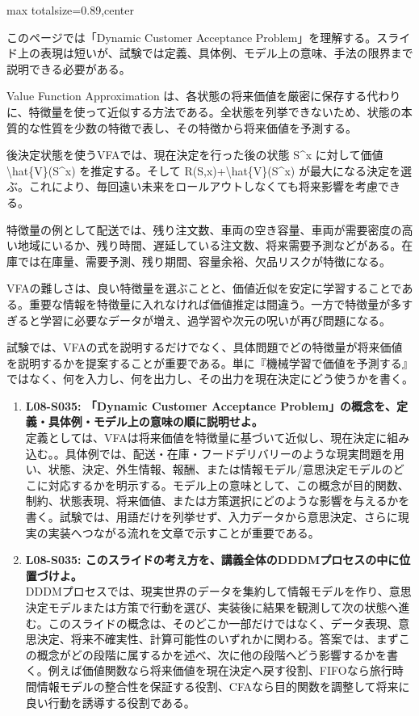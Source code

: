 \begin{minipage}[t]{0.58\textwidth}
\begin{adjustbox}{max totalsize={\textwidth}{0.89\textheight},center}
\begin{minipage}{\textwidth}\scriptsize
{}このページでは「Dynamic Customer Acceptance Problem」を理解する。スライド上の表現は短いが、試験では定義、具体例、モデル上の意味、手法の限界まで説明できる必要がある。\par
Value Function Approximation は、各状態の将来価値を厳密に保存する代わりに、特徴量を使って近似する方法である。全状態を列挙できないため、状態の本質的な性質を少数の特徴で表し、その特徴から将来価値を予測する。\par
後決定状態を使うVFAでは、現在決定を行った後の状態 S\textasciicircum{}x に対して価値 \textbackslash{}hat\{V\}(S\textasciicircum{}x) を推定する。そして R(S,x)+\textbackslash{}hat\{V\}(S\textasciicircum{}x) が最大になる決定を選ぶ。これにより、毎回遠い未来をロールアウトしなくても将来影響を考慮できる。\par
特徴量の例として配送では、残り注文数、車両の空き容量、車両が需要密度の高い地域にいるか、残り時間、遅延している注文数、将来需要予測などがある。在庫では在庫量、需要予測、残り期間、容量余裕、欠品リスクが特徴になる。\par
VFAの難しさは、良い特徴量を選ぶことと、価値近似を安定に学習することである。重要な情報を特徴量に入れなければ価値推定は間違う。一方で特徴量が多すぎると学習に必要なデータが増え、過学習や次元の呪いが再び問題になる。\par
試験では、VFAの式を説明するだけでなく、具体問題でどの特徴量が将来価値を説明するかを提案することが重要である。単に『機械学習で価値を予測する』ではなく、何を入力し、何を出力し、その出力を現在決定にどう使うかを書く。\par{}\begin{enumerate}\item \textbf{L08-S035: 「Dynamic Customer Acceptance Problem」の概念を、定義・具体例・モデル上の意味の順に説明せよ。}\\定義としては、VFAは将来価値を特徴量に基づいて近似し、現在決定に組み込む。。具体例では、配送・在庫・フードデリバリーのような現実問題を用い、状態、決定、外生情報、報酬、または情報モデル/意思決定モデルのどこに対応するかを明示する。モデル上の意味として、この概念が目的関数、制約、状態表現、将来価値、または方策選択にどのような影響を与えるかを書く。試験では、用語だけを列挙せず、入力データから意思決定、さらに現実の実装へつながる流れを文章で示すことが重要である。\item \textbf{L08-S035: このスライドの考え方を、講義全体のDDDMプロセスの中に位置づけよ。}\\DDDMプロセスでは、現実世界のデータを集約して情報モデルを作り、意思決定モデルまたは方策で行動を選び、実装後に結果を観測して次の状態へ進む。このスライドの概念は、そのどこか一部だけではなく、データ表現、意思決定、将来不確実性、計算可能性のいずれかに関わる。答案では、まずこの概念がどの段階に属するかを述べ、次に他の段階へどう影響するかを書く。例えば価値関数なら将来価値を現在決定へ戻す役割、FIFOなら旅行時間情報モデルの整合性を保証する役割、CFAなら目的関数を調整して将来に良い行動を誘導する役割である。\end{enumerate}

\end{minipage}
\end{adjustbox}
\end{minipage}

